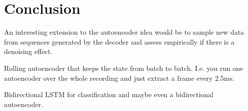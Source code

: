 \chapter{Conclusion}
\label{chapter:conclusion}

An interesting extension to the autoencoder idea would be to sample new data
from sequences generated by the decoder and assess empirically if there is a
denoising effect.

Rolling autoencoder that keeps the state from batch to batch. I.e. you run one
autoencoder over the whole recording and just extract a frame every 2.5ms.

Bidirectional LSTM for classification and maybe even a bidirectional
autoencoder.
